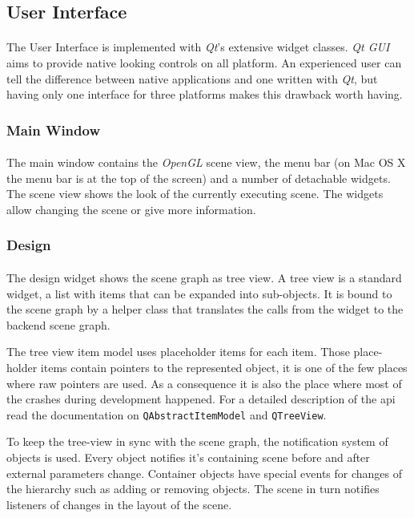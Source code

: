 \subsection{User Interface\label{ImplementationUI}}
\paragraph{}
The User Interface is implemented with \textit{Qt}'s extensive widget classes.
\textit{Qt GUI} aims to provide native looking controls on all platform.
An experienced user can tell the difference between native applications and one written with \textit{Qt}, but having only one interface for three platforms makes this drawback worth having.


\subsubsection{Main Window}
\paragraph{}
The main window contains the \textit{OpenGL} scene view, the menu bar (on Mac OS X the menu bar is at the top of the screen) and a number of detachable widgets.
The scene view shows the look of the currently executing scene.
The widgets allow changing the scene or give more information.

\subsubsection{Design}
\paragraph{}
The design widget shows the scene graph as tree view.
A tree view is a standard widget, a list with items that can be expanded into sub-objects.
It is bound to the scene graph by a helper class that translates the calls from the widget to the backend scene graph.

The tree view item model uses placeholder items for each item.
Those place-holder items contain pointers to the represented object, it is one of the few places where raw pointers are used.
As a consequence it is also the place where most of the crashes during development happened.
For a detailed description of the api read the documentation on \lstinline{QAbstractItemModel} and \lstinline{QTreeView}.

To keep the tree-view in sync with the scene graph, the notification system of objects is used.
Every object notifies it's containing scene before and after external parameters change.
Container objects have special events for changes of the hierarchy such as adding or removing objects.
The scene in turn notifies listeners of changes in the layout of the scene.

